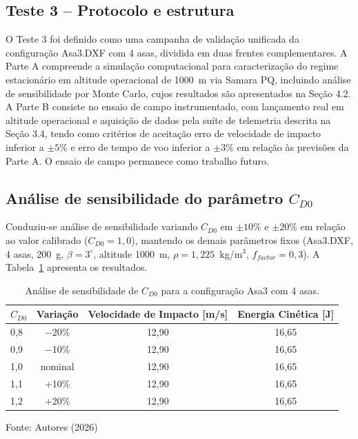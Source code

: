 \documentclass[12pt,fleqn]{article}
\begin{document}
\subsection{Teste 3 -- Protocolo e estrutura}

O Teste 3 foi definido como uma campanha de validação unificada da configuração Asa3.DXF com 4 asas, dividida em duas frentes complementares. A Parte A compreende a simulação computacional para caracterização do regime estacionário em altitude operacional de 1000~m via Samara PQ, incluindo análise de sensibilidade por Monte Carlo, cujos resultados são apresentados na Seção 4.2. A Parte B consiste no ensaio de campo instrumentado, com lançamento real em altitude operacional e aquisição de dados pela suíte de telemetria descrita na Seção 3.4, tendo como critérios de aceitação erro de velocidade de impacto inferior a $\pm5\%$ e erro de tempo de voo inferior a $\pm3\%$ em relação às previsões da Parte A. O ensaio de campo permanece como trabalho futuro.

\subsection{Análise de sensibilidade do parâmetro $C_{D0}$}

Conduziu-se análise de sensibilidade variando $C_{D0}$ em $\pm10\%$ e $\pm20\%$ em relação ao valor calibrado ($C_{D0}=1,0$), mantendo os demais parâmetros fixos (Asa3.DXF, 4 asas, 200~g, $\beta=3^\circ$, altitude 1000~m, $\rho=1,225$~kg/m$^3$, $f_{factor}=0,3$). A Tabela~\ref{tab:cd0} apresenta os resultados.

\begin{table}[htbp]
\caption{Análise de sensibilidade de $C_{D0}$ para a configuração Asa3 com 4 asas.}
\centering
\begin{tabular*}{\textwidth}{@{\extracolsep{\fill}}lccc}
\hline
$C_{D0}$ & Variação & Velocidade de Impacto [m/s] & Energia Cinética [J] \\
\hline
0,8 & $-$20\% & 12,90 & 16,65 \\
0,9 & $-$10\% & 12,90 & 16,65 \\
1,0 & nominal & 12,90 & 16,65 \\
1,1 & +10\% & 12,90 & 16,65 \\
1,2 & +20\% & 12,90 & 16,65 \\
\hline
\end{tabular*}
{\footnotesize\centering Fonte: Autores (2026)\par}
\label{tab:cd0}
\end{table}
\end{document}
